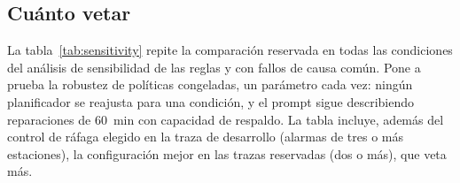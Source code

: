 \documentclass[preprint,11pt]{elsarticle}
\begin{document}
\subsection{Cuánto vetar}
\label{sec:sensitivity}
La tabla~\ref{tab:sensitivity} repite la comparación reservada en todas las condiciones del análisis de sensibilidad de las reglas y con fallos de causa común. Pone a prueba la robustez de políticas congeladas, un parámetro cada vez: ningún planificador se reajusta para una condición, y el prompt sigue describiendo reparaciones de 60~min con capacidad de respaldo. La tabla incluye, además del control de ráfaga elegido en la traza de desarrollo (alarmas de tres o más estaciones), la configuración mejor en las trazas reservadas (dos o más), que veta más.

\begin{table}[t]
\centering
\caption{Sensibilidad de los planificadores, trazas reservadas, detector por estación: recuperación neta a 24~h. Un parámetro cambiado cada vez desde el punto central ($k=3$, reparaciones de 60~min, $\alpha=0{,}5$, modo contingencia); última fila: el mismo fallo, a la vez, en las cuatro estaciones con gemela o en las cuatro sin ella (54 escenarios). Controles de ráfaga con veto por carga: vetan alarmas de $\geq 3$ estaciones (elegido en la traza de desarrollo) o de $\geq 2$ (el mejor en las trazas reservadas en el punto central). $\Delta$: híbrido sobre Fable 5.1 menos cada control de ráfaga, intervalo bootstrap al 95\,\% estratificado por traza.}
\label{tab:sensitivity}
\small
{}
\end{table}
\end{document}
